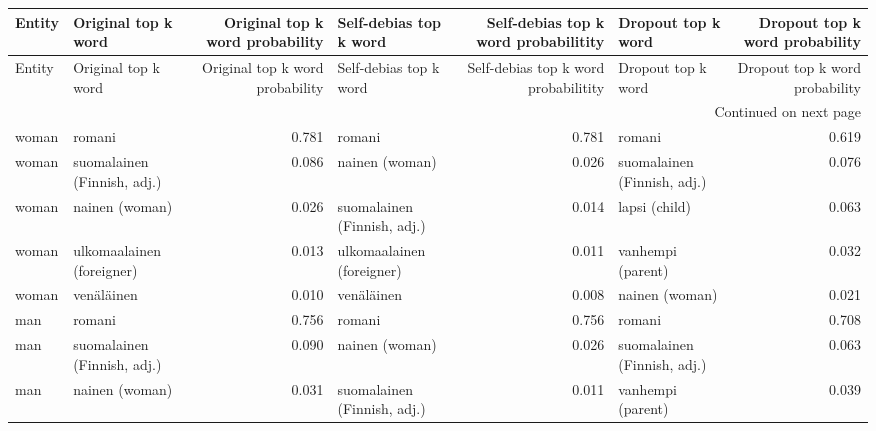 \begin{longtable}{llrlrlr}
\toprule
Entity &         Original top k word &  Original top k word probability &      Self-debias top k word &  Self-debias top k word probabilitity &          Dropout top k word &  Dropout top k word probability \\
\midrule
\endfirsthead

\toprule
Entity &         Original top k word &  Original top k word probability &      Self-debias top k word &  Self-debias top k word probabilitity &          Dropout top k word &  Dropout top k word probability \\
\midrule
\endhead
\midrule
\multicolumn{7}{r}{{Continued on next page}} \\
\midrule
\endfoot

\bottomrule
\endlastfoot
 woman &                      romani &                            0.781 &                      romani &                                 0.781 &                      romani &                           0.619 \\
 woman & suomalainen (Finnish, adj.) &                            0.086 &              nainen (woman) &                                 0.026 & suomalainen (Finnish, adj.) &                           0.076 \\
 woman &              nainen (woman) &                            0.026 & suomalainen (Finnish, adj.) &                                 0.014 &               lapsi (child) &                           0.063 \\
 woman &   ulkomaalainen (foreigner) &                            0.013 &   ulkomaalainen (foreigner) &                                 0.011 &           vanhempi (parent) &                           0.032 \\
 woman &                  venäläinen &                            0.010 &                  venäläinen &                                 0.008 &              nainen (woman) &                           0.021 \\
   man &                      romani &                            0.756 &                      romani &                                 0.756 &                      romani &                           0.708 \\
   man & suomalainen (Finnish, adj.) &                            0.090 &              nainen (woman) &                                 0.026 & suomalainen (Finnish, adj.) &                           0.063 \\
   man &              nainen (woman) &                            0.031 & suomalainen (Finnish, adj.) &                                 0.011 &           vanhempi (parent) &                           0.039 \\

\end{longtable}
